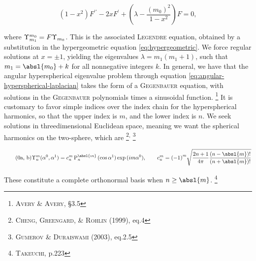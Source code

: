 \begin{equation}
  (1 - x^2) F^{\prime\prime} - 2x F^{\prime} + \left( \lambda - \frac{{(m_0)}^2}{1 - x^2} \right) F = 0,
\end{equation}

\noindent
where $\Upsilon_{m_1}^{m_0} = F \Upsilon_{m_0}$.
This is the associated \textsc{Legendre} equation, obtained by a substitution in the hypergeometric equation \eqref{eq:hypergeometric}.
We force regular solutions at $x = \pm 1$, yielding the eigenvalues $\lambda = m_1(m_1 + 1)$, such that $m_1 = \absl{m_0} + k$ for all nonnegative integers $k$.
In general, we have that the angular hyperspherical eigenvalue problem through equation \eqref{eq:angular-hyperspherical-laplacian} takes the form of a \textsc{Gegenbauer} equation, with solutions in the \textsc{Gegenbauer} polynomials times a sinusoidal function.%
\footnote{%
  \cite{avery2018hyperspherical} \textsc{Avery} \& \textsc{Avery}, \S3.5
}
It is customary to favor simple indices over the index chain for the hyperspherical harmonics, so that the upper index is $m$, and the lower index is $n$.
We seek solutions in threedimensional Euclidean space, meaning we want the spherical harmonics on the two-sphere, which are%
\footnote{%
  \cite{cheng1999fast} \textsc{Cheng}, \textsc{Greengard}, \& \textsc{Rohlin}  (1999), eq.4
}\textsuperscript{,}%
\footnote{%
  \cite{gumerov2003recursions} \textsc{Gumerov} \& \textsc{Duraiswami} (2003), eq.2.5
}

\begin{subequations}\label{eq:sphericalharmonics}
  \begin{equation}\tag{\theequation{a, b}}
    \spherical_{n}^{m}(\alpha^{0}, \alpha^{1}) = c_n^m \legendre_{n}^{\absl{m}}{(\cos{\alpha^1})} \exp{(im\alpha^0)}, \qquad c_n^m = {(-1)}^m \sqrt{\frac{2n+1}{4\pi} \frac{(n - \absl{m})!}{(n + \absl{m})!}}
  \end{equation}
\end{subequations}

\noindent
These constitute a complete orthonormal basis when $n \geq \absl{m}$.%
\footnote{%
  \cite{takeuchi1994modern} \textsc{Takeuchi}, p.223
}
